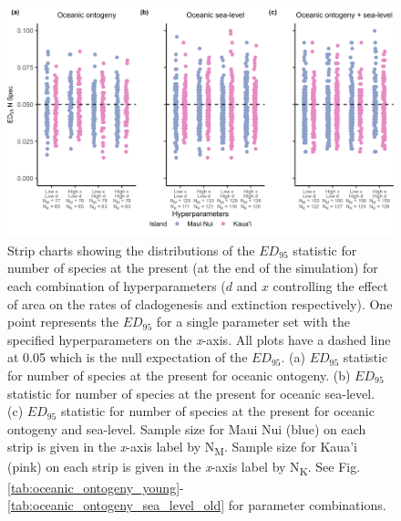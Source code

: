 \begin{figure}
    \centering
    \includegraphics[width=\textwidth]{JBI-21-0508_FigS9.png}
    \caption{Strip charts showing the distributions of the $ED_{95}$ statistic for number of species at the present (at the end of the simulation) for each combination of hyperparameters ($d$ and $x$ controlling the effect of area on the rates of cladogenesis and extinction respectively). One point represents the $ED_{95}$ for a single parameter set with the specified hyperparameters on the \textit{x}-axis. All plots have a dashed line at 0.05 which is the null expectation of the $ED_{95}$. (a) $ED_{95}$ statistic for number of species at the present for oceanic ontogeny. (b) $ED_{95}$ statistic for number of species at the present for oceanic sea-level. (c) $ED_{95}$ statistic for number of species at the present for oceanic ontogeny and sea-level. Sample size for Maui Nui (blue) on each strip is given in the \textit{x}-axis label by N\textsubscript{M}. Sample size for Kaua'i (pink) on each strip is given in the \textit{x}-axis label by N\textsubscript{K}. See Fig. \ref{tab:oceanic_ontogeny_young}-\ref{tab:oceanic_ontogeny_sea_level_old} for parameter combinations.}
    \label{fig:Hyperparameters_num_spec}
\end{figure}

